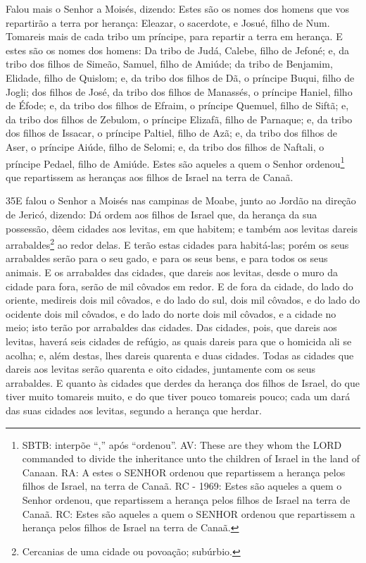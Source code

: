 Falou mais o Senhor a Moisés, dizendo: Estes são os nomes
dos homens que vos repartirão a terra por herança: Eleazar, o
sacerdote, e Josué, filho de Num. Tomareis mais de cada tribo
um príncipe, para repartir a terra em herança. E estes são os
nomes dos homens: Da tribo de Judá, Calebe, filho de Jefoné;
e, da tribo dos filhos de Simeão, Samuel, filho de Amiúde;
da tribo de Benjamim, Elidade, filho de Quislom; e, da
tribo dos filhos de Dã, o príncipe Buqui, filho de Jogli; dos
filhos de José, da tribo dos filhos de Manassés, o príncipe Haniel,
filho de Éfode; e, da tribo dos filhos de Efraim, o príncipe
Quemuel, filho de Siftã; e, da tribo dos filhos de Zebulom, o
príncipe Elizafã, filho de Parnaque; e, da tribo dos filhos
de Issacar, o príncipe Paltiel, filho de Azã; e, da tribo dos
filhos de Aser, o príncipe Aiúde, filho de Selomi; e, da
tribo dos filhos de Naftali, o príncipe Pedael, filho de Amiúde.
Estes são aqueles a quem o Senhor ordenou\footnote{SBTB:
interpõe ``,'' após ``ordenou''. AV: These are they whom the LORD
commanded to divide the inheritance unto the children of Israel in
the land of Canaan. RA: A estes o SENHOR ordenou que repartissem a
herança pelos filhos de Israel, na terra de Canaã. RC - 1969: Estes
são aqueles a quem o Senhor ordenou, que repartissem a herança pelos
filhos de Israel na terra de Canaã. RC: Estes são aqueles a quem o
SENHOR ordenou que repartissem a herança pelos filhos de Israel na
terra de Canaã.} que repartissem as heranças aos filhos de Israel na
terra de Canaã.

\medskip

\lettrine{35} E falou o Senhor a Moisés nas campinas de Moabe,
junto ao Jordão na direção de Jericó, dizendo: Dá ordem aos
filhos de Israel que, da herança da sua possessão, dêem cidades aos
levitas, em que habitem; e também aos levitas dareis
arrabaldes\footnote{Cercanias de uma cidade ou povoação; subúrbio.}
ao redor delas. E terão estas cidades para habitá-las; porém os
seus arrabaldes serão para o seu gado, e para os seus bens, e para
todos os seus animais. E os arrabaldes das cidades, que dareis
aos levitas, desde o muro da cidade para fora, serão de mil côvados
em redor. E de fora da cidade, do lado do oriente, medireis dois
mil côvados, e do lado do sul, dois mil côvados, e do lado do
ocidente dois mil côvados, e do lado do norte dois mil côvados, e a
cidade no meio; isto terão por arrabaldes das cidades. Das
cidades, pois, que dareis aos levitas, haverá seis cidades de
refúgio, as quais dareis para que o homicida ali se acolha; e, além
destas, lhes dareis quarenta e duas cidades. Todas as cidades
que dareis aos levitas serão quarenta e oito cidades, juntamente com
os seus arrabaldes. E quanto às cidades que derdes da herança
dos filhos de Israel, do que tiver muito tomareis muito, e do que
tiver pouco tomareis pouco; cada um dará das suas cidades aos
levitas, segundo a herança que herdar.


